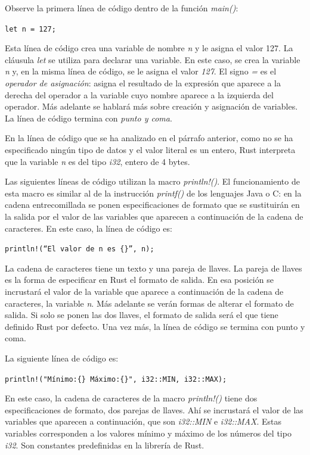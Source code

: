 Observe la primera línea de código dentro de la función \textit{main()}:

{\centering \texttt{let n = 127;} \par}

Esta línea de código crea una variable de nombre \textit{n} y le asigna el valor 127. La cláusula \textit{let} se utiliza para declarar una variable. En este caso, se crea la variable \textit{n} y, en la misma línea de código, se le asigna el valor \textit{127}. El signo \textit{=} es el \textit{operador de asignación}: asigna el resultado de la expresión que aparece a la derecha del operador a la variable cuyo nombre aparece a la izquierda del operador. Más adelante se hablará más sobre creación y asignación de variables. La línea de código termina con \textit{punto y coma}.

En la línea de código que se ha analizado en el párrafo anterior, como no se ha especificado ningún tipo de datos y el valor literal es un entero, Rust interpreta que la variable \textit{n} es del tipo \textit{i32}, entero de 4 bytes.

Las siguientes líneas de código utilizan la macro \textit{println!()}. El funcionamiento de esta macro es similar al de la instrucción \textit{printf()} de los lenguajes Java o C: en la cadena entrecomillada se ponen especificaciones de formato que se sustituirán en la salida por el valor de las variables que aparecen a continuación de la cadena de caracteres. En este caso, la línea de código es:

{\centering \texttt{println!(``El valor de n es \{\}'', n);} \par}

La cadena de caracteres tiene un texto y una pareja de llaves. La pareja de llaves es la forma de especificar en Rust el formato de salida. En esa posición se incrustará el valor de la variable que aparece a continuación de la cadena de caracteres, la variable \textit{n}. Más adelante se verán formas de alterar el formato de salida. Si solo se ponen las dos llaves, el formato de salida será el que tiene definido Rust por defecto. Una vez más, la línea de código se termina con punto y coma.
\vspace{1em}

La siguiente línea de código es:

{\centering \texttt{println!("Mínimo:\{\} Máximo:\{\}", i32::MIN, i32::MAX);} \par}

En este caso, la cadena de caracteres de la macro \textit{println!()} tiene dos especificaciones de formato, dos parejas de llaves. Ahí se incrustará el valor de las variables que aparecen a continuación, que son \textit{i32::MIN} e \textit{i32::MAX}. Estas variables corresponden a los valores mínimo y máximo de los números del tipo \textit{i32}. Son constantes predefinidas en la librería de Rust. 

